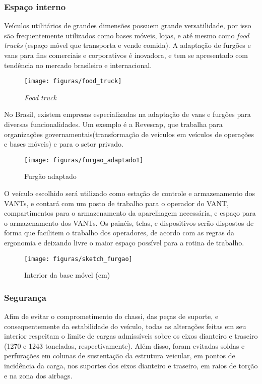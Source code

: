 \subsubsection{Espaço interno}

Veículos utilitários de grandes dimensões possuem grande versatilidade, por isso são frequentemente utilizados como bases móveis, lojas, e até mesmo como \textit{food trucks} (espaço móvel que transporta e vende comida). A adaptação de furgões e vans para fins comerciais e corporativos é inovadora, e tem se apresentado com tendência no mercado brasileiro e internacional.\cite{foodtruckrace2014}

\begin{figure}[H]
\centering\texttt{[image: figuras/food\_truck]}
\caption{\textit{Food truck}}
\end{figure}

No Brasil, existem empresas especializadas na adaptação de vans e furgões para diversas funcionalidades. Um exemplo é a Revescap\cite{revescap2014}, que trabalha para organizações governamentais(transformação de veículos em veículos de operações e  bases móveis) e para o setor privado.

\begin{figure}[H]
\centering\texttt{[image: figuras/furgao\_adaptado1]}
\caption{Furgão adaptado}
\end{figure}

O veículo escolhido será utilizado como estação de controle e armazenamento dos VANTs, e contará com um posto de trabalho para o operador do VANT, compartimentos para o armazenamento da aparelhagem necessária, e espaço para o armazenamento dos VANTs. Os painéis, telas, e dispositivos serão dispostos de forma que facilitem o trabalho dos operadores, de acordo com as regras da ergonomia e deixando livre o maior espaço possível para a rotina de trabalho.

\begin{figure}[H]
\centering\texttt{[image: figuras/sketch\_furgao]}
\caption{Interior da base móvel (cm)}
\end{figure}

\subsubsection{Segurança}

Afim de evitar o comprometimento do chassi, das peças de suporte, e consequentemente da estabilidade do veículo, todas as alterações feitas em seu interior respeitam o limite de cargas admissíveis sobre os eixos dianteiro e traseiro (1270 e 1243 toneladas, respectivamente).  Além disso, foram evitadas soldas e perfurações em colunas de sustentação da estrutura veicular, em pontos de incidência da carga, nos suportes dos eixos dianteiro e traseiro, em raios de torção e na zona dos airbags.\cite{diretivas2012}

